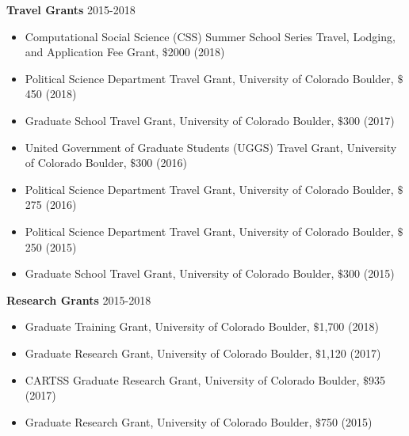 \documentclass[11pt]{article}
\newenvironment{innerlist}[1][\enskip\textbullet]%
        {\begin{itemize}[#1,leftmargin=*,parsep=0pt,itemsep=0pt,topsep=0pt,partopsep=0pt]}
        {\end{itemize}}
\begin{document}
\textbf{Travel Grants} \hfill{2015-2018}

\begin{innerlist}
	\item Computational Social Science (CSS) Summer School Series Travel, Lodging, and Application Fee Grant, $\$$2000 (2018)
\end{innerlist}
\begin{innerlist}
	\item Political Science Department Travel Grant, University of Colorado Boulder, $\$$450 (2018)
\end{innerlist}
\begin{innerlist}
	\item Graduate School Travel Grant, University of Colorado Boulder, $\$$300 (2017)
\end{innerlist}
\begin{innerlist}
	\item United Government of Graduate Students (UGGS) Travel Grant, University of Colorado Boulder, $\$$300 (2016)
\end{innerlist}	
\begin{innerlist}
	\item Political Science Department Travel Grant, University of Colorado Boulder, $\$$275 (2016)
\end{innerlist}	
\begin{innerlist}
	\item Political Science Department Travel Grant, University of Colorado Boulder, $\$$250 (2015)
\end{innerlist}
\begin{innerlist}
	\item  Graduate School Travel Grant, University of Colorado Boulder, $\$$300 (2015)\\
\end{innerlist}

\textbf{Research Grants} \hfill{2015-2018}
\begin{innerlist}
	\item Graduate Training Grant, University of Colorado Boulder, $\$$1,700 (2018)
	\item Graduate Research Grant, University of Colorado Boulder, $\$$1,120 (2017)
	\item CARTSS Graduate Research Grant, University of Colorado Boulder, $\$$935 (2017)
	\item Graduate Research Grant, University of Colorado Boulder, $\$$750 (2015)
\end{innerlist}
\end{document}
